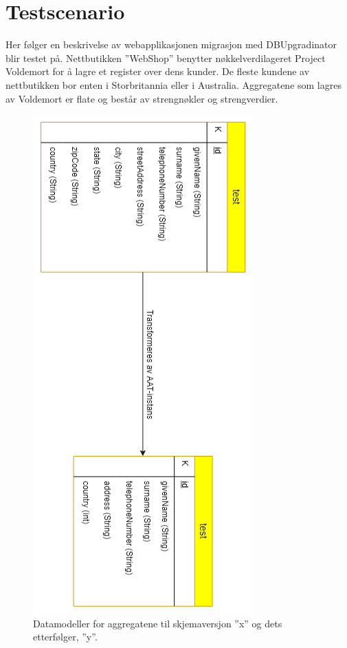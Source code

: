 \section{Testscenario}

Her følger en beskrivelse av webapplikasjonen migrasjon med DBUpgradinator blir testet på. Nettbutikken ''WebShop'' benytter nøkkelverdi\-lageret Project Voldemort for å lagre et register over dens kunder. De fleste kundene av nettbutikken bor enten i Storbritannia eller i Australia. Aggregatene som lagres av Voldemort er flate og består av strengnøkler og strengverdier.

\begin{figure}[hbtp]
    \centering
    \includegraphics[scale=0.9]{fig/WSS-AggregatModell.png}
    \caption{Datamodeller for aggregatene til skjemaversjon ''x'' og dets etterfølger, ''y''.}
    \label{fig11}
\end{figure}

